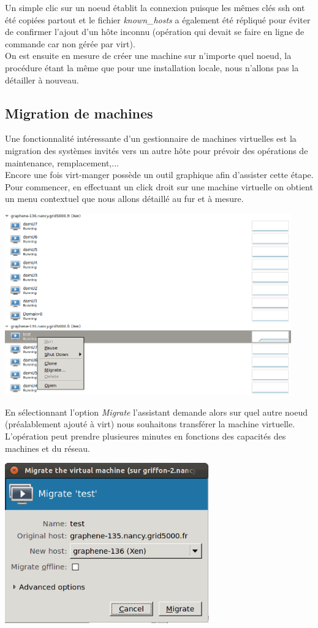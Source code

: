 Un simple clic sur un noeud établit la connexion puisque les mêmes clés ssh ont été copiées partout et le fichier \emph{known\_hosts} a également été répliqué pour éviter de confirmer l'ajout d'un hôte inconnu (opération qui devait se faire en ligne de commande car non gérée par virt).
\\
On est ensuite en mesure de créer une machine sur n'importe quel noeud, la procédure étant la même que pour une installation locale, nous n'allons pas la détailler à nouveau.

\subsection{Migration de machines}
Une fonctionnalité intéressante d'un gestionnaire de machines virtuelles est la migration des systèmes invités vers un autre hôte pour prévoir des opérations de maintenance, remplacement,...\\
Encore une fois virt-manger possède un outil graphique afin d'assister cette étape. Pour commencer, en effectuant un click droit sur une machine virtuelle on obtient un menu contextuel que nous allons détaillé au fur et à mesure.
\begin{center}
  \includegraphics[width=350pt]{images/virt-menu-context.png}
\end{center}
En sélectionnant l'option \emph{Migrate} l'assistant demande alors sur quel autre noeud (préalablement ajouté à virt) nous souhaitons transférer la machine virtuelle. L'opération peut prendre plusieures minutes en fonctions des capacités des machines et du réseau.
\begin{center}
  \includegraphics[width=250pt]{images/migration1.png}
\end{center}
